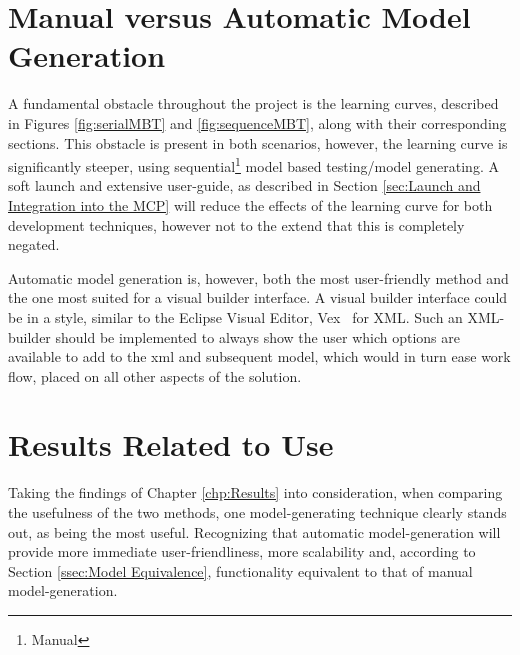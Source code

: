 \section{Manual versus Automatic Model Generation}
A fundamental obstacle throughout the project is the learning curves, described in Figures \ref{fig:serialMBT} and \ref{fig:sequenceMBT}, along with their corresponding sections. This obstacle is present in both scenarios, however, the learning curve is significantly steeper, using sequential\footnote{Manual} model based testing/model generating. A soft launch and extensive user-guide, as described in Section \ref{sec:Launch and Integration into the MCP} will reduce the effects of the learning curve for both development techniques, however not to the extend that this is completely negated.

Automatic model generation is, however, both the most user-friendly method and the one most suited for a visual builder interface. A visual builder interface could be in a style, similar to the Eclipse Visual Editor, Vex~\cite{vex} for XML. Such an XML-builder should be implemented to always show the user which options are available to add to the xml and subsequent model, which would in turn ease work flow, placed on all other aspects of the solution.

\section{Results Related to Use}
Taking the findings of Chapter \ref{chp:Results} into consideration, when comparing the usefulness of the two methods, one model-generating technique clearly stands out, as being the most useful. Recognizing that automatic model-generation will provide more immediate user-friendliness, more scalability and, according to Section \ref{ssec:Model Equivalence}, functionality equivalent to that of manual model-generation.

